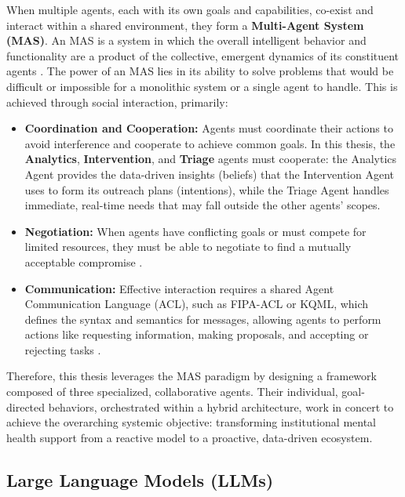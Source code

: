When multiple agents, each with its own goals and capabilities, co-exist and interact within a shared environment, they form a \textbf{Multi-Agent System (MAS)}. An MAS is a system in which the overall intelligent behavior and functionality are a product of the collective, emergent dynamics of its constituent agents \cite{FIND_CITATION_PLEASE}. The power of an MAS lies in its ability to solve problems that would be difficult or impossible for a monolithic system or a single agent to handle. This is achieved through social interaction, primarily:
\begin{itemize}
    \item \textbf{Coordination and Cooperation:} Agents must coordinate their actions to avoid interference and cooperate to achieve common goals. In this thesis, the \textbf{Analytics}, \textbf{Intervention}, and \textbf{Triage} agents must cooperate: the Analytics Agent provides the data-driven insights (beliefs) that the Intervention Agent uses to form its outreach plans (intentions), while the Triage Agent handles immediate, real-time needs that may fall outside the other agents' scopes.
    \item \textbf{Negotiation:} When agents have conflicting goals or must compete for limited resources, they must be able to negotiate to find a mutually acceptable compromise \cite{FIND_CITATION_PLEASE}.
    \item \textbf{Communication:} Effective interaction requires a shared Agent Communication Language (ACL), such as FIPA-ACL or KQML, which defines the syntax and semantics for messages, allowing agents to perform actions like requesting information, making proposals, and accepting or rejecting tasks \cite{FIND_CITATION_PLEASE}.
\end{itemize}
Therefore, this thesis leverages the MAS paradigm by designing a framework composed of three specialized, collaborative agents. Their individual, goal-directed behaviors, orchestrated within a hybrid architecture, work in concert to achieve the overarching systemic objective: transforming institutional mental health support from a reactive model to a proactive, data-driven ecosystem.

\subsection{Large Language Models (LLMs)}
\label{subsec:llms}

